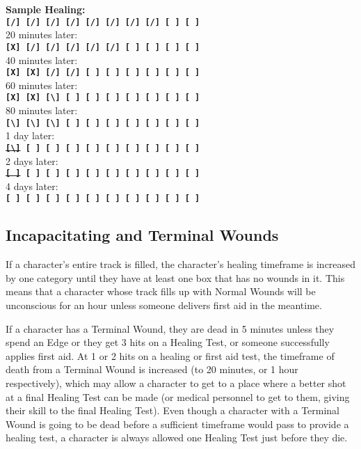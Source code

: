\textbf{Sample Healing:}\\
\texttt{\textbf{[/] [/] [/] [/] [/] [/] [/] [/] [ ] [ ]}}\\
20 minutes later:\\
\texttt{\textbf{[X] [/] [/] [/] [/] [/] [ ] [ ] [ ] [ ]}}\\
40 minutes later:\\
\texttt{\textbf{[X] [X] [/] [/] [ ] [ ] [ ] [ ] [ ] [ ]}}\\
60 minutes later:\\
\texttt{\textbf{[X] [X] [\textbackslash] [ ] [ ] [ ] [ ] [ ] [ ] [ ]}}\\
80 minutes later:\\
\texttt{\textbf{[\textbackslash] [\textbackslash] [\textbackslash] [ ] [ ] [ ] [ ] [ ] [ ] [ ]}}\\
1 day later:\\
\texttt{\textbf{\sout{[\textbackslash]} [ ] [ ] [ ] [ ] [ ] [ ] [ ] [ ] [ ]}}\\
2 days later:\\
\texttt{\textbf{\sout{[ ]} [ ] [ ] [ ] [ ] [ ] [ ] [ ] [ ] [ ]}}\\
4 days later:\\
\texttt{\textbf{[ ] [ ] [ ] [ ] [ ] [ ] [ ] [ ] [ ] [ ]}}

\subsection{Incapacitating and Terminal Wounds}

\hspace{\parindent} If a character's entire track is filled, the character's healing timeframe is increased by one category until they have at least one box that has no wounds in it. This means that a character whose track fills up with Normal Wounds will be unconscious for an hour unless someone delivers first aid in the meantime.

If a character has a Terminal Wound, they are dead in 5 minutes unless they spend an Edge or they get 3 hits on a Healing Test, or someone successfully applies first aid. At 1 or 2 hits on a healing or first aid test, the timeframe of death from a Terminal Wound is increased (to 20 minutes, or 1 hour respectively), which may allow a character to get to a place where a better shot at a final Healing Test can be made (or medical personnel to get to them, giving their skill to the final Healing Test). Even though a character with a Terminal Wound is going to be dead before a sufficient timeframe would pass to provide a healing test, a character is always allowed one Healing Test just before they die.

